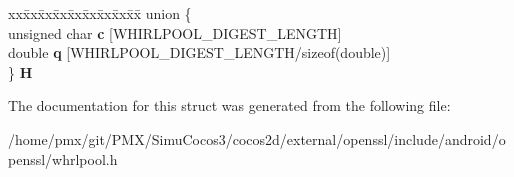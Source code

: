 \begin{DoxyCompactItemize}
\begin{tabbing}
\end{tabbing}\item 
\mbox{\label{structWHIRLPOOL__CTX_ad12048c5758ea73bae6c9e7166881496}} 
\begin{tabbing}
xx\=xx\=xx\=xx\=xx\=xx\=xx\=xx\=xx\=\kill
union \{\\
\>unsigned char {\bfseries c} \mbox{[}WHIRLPOOL\_DIGEST\_LENGTH\mbox{]}\\
\>double {\bfseries q} \mbox{[}WHIRLPOOL\_DIGEST\_LENGTH/sizeof(double)\mbox{]}\\
\} {\bfseries H}\\

\end{tabbing}\end{DoxyCompactItemize}


The documentation for this struct was generated from the following file\+:\begin{DoxyCompactItemize}
\item 
/home/pmx/git/\+P\+M\+X/\+Simu\+Cocos3/cocos2d/external/openssl/include/android/openssl/whrlpool.\+h\end{DoxyCompactItemize}

